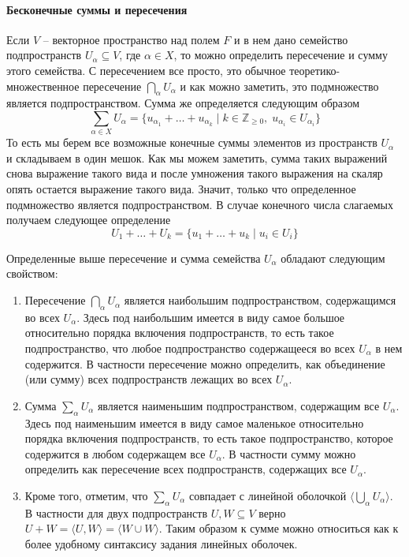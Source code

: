 \paragraph{Бесконечные суммы и пересечения}

Если $V$ -- векторное пространство над полем $F$ и в нем дано семейство подпространств $U_\alpha \subseteq V$, где $\alpha\in X$, то можно определить пересечение и сумму этого семейства.
С пересечением все просто, это обычное теоретико-множественное пересечение $\bigcap_{\alpha} U_\alpha$ и как можно заметить, это подмножество является подпространством.
Сумма же определяется следующим образом
\[
\sum_{\alpha \in X} U_\alpha = \{u_{\alpha_1}+\ldots+u_{\alpha_k} \mid k\in\mathbb Z_{\geqslant 0},\; u_{\alpha_i}\in U_{\alpha_i}\}
\]
То есть мы берем все возможные конечные суммы элементов из пространств $U_\alpha$ и складываем в один мешок.
Как мы можем заметить, сумма таких выражений снова выражение такого вида и после умножения такого выражения на скаляр опять остается выражение такого вида.
Значит, только что определенное подмножество является подпространством.
В случае конечного числа слагаемых получаем следующее определение
\[
U_1 + \ldots + U_k = \{u_1 + \ldots + u_k \mid u_i\in U_i\}
\]

Определенные выше пересечение и сумма семейства $U_\alpha$ обладают следующим свойством:
\begin{enumerate}
\item Пересечение $\bigcap_{\alpha} U_\alpha$ является наибольшим подпространством, содержащимся во всех $U_\alpha$.
Здесь под наибольшим имеется в виду самое большое относительно порядка включения подпространств, то есть такое подпространство, что любое подпространство содержащееся во всех $U_\alpha$ в нем содержится.
В частности пересечение можно определить, как объединение (или сумму) всех подпространств лежащих во всех $U_\alpha$.

\item Сумма $\sum_\alpha U_\alpha$ является наименьшим подпространством, содержащим все $U_\alpha$.
Здесь под наименьшим имеется в виду самое маленькое относительно порядка включения подпространств, то есть такое подпространство, которое содержится в любом содержащем все $U_\alpha$.
В частности сумму можно определить как пересечение всех подпространств, содержащих все $U_\alpha$.

\item Кроме того, отметим, что $\sum_{\alpha} U_\alpha$ совпадает с линейной оболочкой $\langle \bigcup_\alpha U_\alpha \rangle$.
В частности для двух подпространств $U,W\subseteq V$ верно $U + W = \langle U, W\rangle = \langle W\cup W\rangle$.
Таким образом к сумме можно относиться как к более удобному синтаксису задания линейных оболочек.
\end{enumerate}




